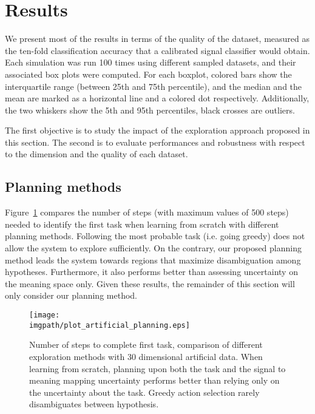 \section{Results}

We present most of the results in terms of the quality of the dataset, measured as the ten-fold classification accuracy that a calibrated signal classifier would obtain. Each simulation was run 100 times using different sampled datasets, and their associated box plots were computed. For each boxplot, colored bars show the interquartile range (between 25th and 75th percentile), and the median and the mean are marked as a horizontal line and a colored dot respectively. Additionally, the two whiskers show the 5th and 95th percentiles, black crosses are outliers. 

The first objective is to study the impact of the exploration approach proposed in this section. The second is to evaluate performances and robustness with respect to the dimension and the quality of each dataset.

\subsection{Planning methods}

Figure~\ref{fig:artificialplanning} compares the number of steps (with maximum values of 500 steps) needed to identify the first task when learning from scratch with different planning methods. Following the most probable task (i.e. going greedy) does not allow the system to explore sufficiently. On the contrary, our proposed planning method leads the system towards regions that maximize disambiguation among hypotheses. Furthermore, it also performs better than assessing uncertainty on the meaning space only. Given these results, the remainder of this section will only consider our planning method.

\begin{figure}[!ht]
  \centering
      \texttt{[image: \\imgpath/plot\_artificial\_planning.eps]}
      \caption{Number of steps to complete first task, comparison of different exploration methods with 30 dimensional artificial data. When learning from scratch, planning upon both the task and the signal to meaning mapping uncertainty performs better than relying only on the uncertainty about the task. Greedy action selection rarely disambiguates between hypothesis.}
    \label{fig:artificialplanning}
\end{figure}

